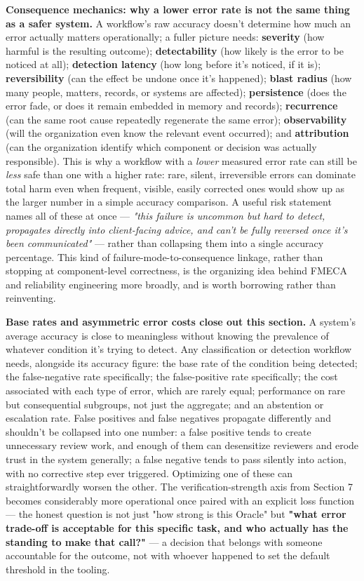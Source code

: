 \textbf{Consequence mechanics: why a lower error rate is not the same thing as a safer system.} A workflow's raw accuracy doesn't determine how much an error actually matters operationally; a fuller picture needs: \textbf{severity} (how harmful is the resulting outcome); \textbf{detectability} (how likely is the error to be noticed at all); \textbf{detection latency} (how long before it's noticed, if it is); \textbf{reversibility} (can the effect be undone once it's happened); \textbf{blast radius} (how many people, matters, records, or systems are affected); \textbf{persistence} (does the error fade, or does it remain embedded in memory and records); \textbf{recurrence} (can the same root cause repeatedly regenerate the same error); \textbf{observability} (will the organization even know the relevant event occurred); and \textbf{attribution} (can the organization identify which component or decision was actually responsible). This is why a workflow with a \emph{lower} measured error rate can still be \emph{less} safe than one with a higher rate: rare, silent, irreversible errors can dominate total harm even when frequent, visible, easily corrected ones would show up as the larger number in a simple accuracy comparison. A useful risk statement names all of these at once --- \emph{"this failure is uncommon but hard to detect, propagates directly into client-facing advice, and can't be fully reversed once it's been communicated"} --- rather than collapsing them into a single accuracy percentage. This kind of failure-mode-to-consequence linkage, rather than stopping at component-level correctness, is the organizing idea behind FMECA and reliability engineering more broadly, and is worth borrowing rather than reinventing.

\textbf{Base rates and asymmetric error costs close out this section.} A system's average accuracy is close to meaningless without knowing the prevalence of whatever condition it's trying to detect. Any classification or detection workflow needs, alongside its accuracy figure: the base rate of the condition being detected; the false-negative rate specifically; the false-positive rate specifically; the cost associated with each type of error, which are rarely equal; performance on rare but consequential subgroups, not just the aggregate; and an abstention or escalation rate. False positives and false negatives propagate differently and shouldn't be collapsed into one number: a false positive tends to create unnecessary review work, and enough of them can desensitize reviewers and erode trust in the system generally; a false negative tends to pass silently into action, with no corrective step ever triggered. Optimizing one of these can straightforwardly worsen the other. The verification-strength axis from Section 7 becomes considerably more operational once paired with an explicit loss function --- the honest question is not just "how strong is this Oracle" but \textbf{"what error trade-off is acceptable for this specific task, and who actually has the standing to make that call?"} --- a decision that belongs with someone accountable for the outcome, not with whoever happened to set the default threshold in the tooling.
